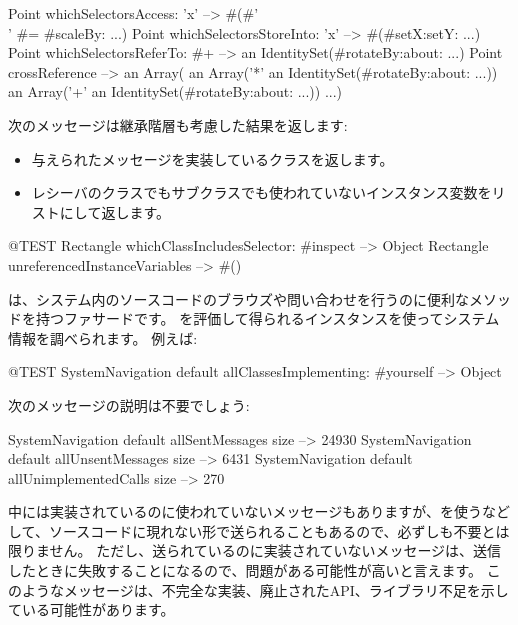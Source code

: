 \documentclass[a4paper,10pt,twoside]{book}
\begin{document}
\begin{code}{} %
Point whichSelectorsAccess: 'x'    --> #(#'\\' #= #scaleBy: ...)
Point whichSelectorsStoreInto: 'x' --> #(#setX:setY: ...)
Point whichSelectorsReferTo: #+  --> an IdentitySet(#rotateBy:about: ...)
Point crossReference --> an Array(
		an Array('*' an IdentitySet(#rotateBy:about: ...))
		an Array('+' an IdentitySet(#rotateBy:about: ...))
		...)
\end{code}

次のメッセージは継承階層も考慮した結果を返します:
\begin{itemize}
\item {} 与えられたメッセージを実装しているクラスを返します。
\item {} レシーバのクラスでもサブクラスでも使われていないインスタンス変数をリストにして返します。
\end{itemize}

\begin{code}{@TEST}
Rectangle whichClassIncludesSelector: #inspect --> Object
Rectangle unreferencedInstanceVariables            --> #()
\end{code}

は、システム内のソースコードのブラウズや問い合わせを行うのに便利なメソッドを持つファサードです。
 を評価して得られるインスタンスを使ってシステム情報を調べられます。
例えば:

\begin{code}{@TEST}
SystemNavigation default allClassesImplementing: #yourself --> {Object}
\end{code}

次のメッセージの説明は不要でしょう:

\begin{code}{}
SystemNavigation default allSentMessages size          --> 24930
SystemNavigation default allUnsentMessages size      --> 6431
SystemNavigation default allUnimplementedCalls size --> 270
\end{code}

中には実装されているのに使われていないメッセージもありますが、を使うなどして、ソースコードに現れない形で送られることもあるので、必ずしも不要とは限りません。
ただし、送られているのに実装されていないメッセージは、送信したときに失敗することになるので、問題がある可能性が高いと言えます。
このようなメッセージは、不完全な実装、廃止されたAPI、ライブラリ不足を示している可能性があります。
\end{document}
